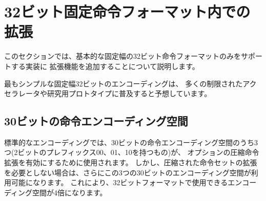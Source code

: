 \begin{comment}
\section{Extensions within fixed-width 32-bit instruction format}
\end{comment}
\section{32ビット固定命令フォーマット内での拡張}
\label{fix32b}

\begin{comment}
In this section, we discuss adding extensions to implementations that
only support the base fixed-width 32-bit instruction format.
\end{comment}
このセクションでは、基本的な固定幅の32ビット命令フォーマットのみをサポートする実装に
拡張機能を追加することについて説明します。

\begin{commentary}
\begin{comment}
We anticipate the simplest fixed-width 32-bit encoding will be popular for
many restricted accelerators and research prototypes.
\end{comment}
最もシンプルな固定幅32ビットのエンコーディングは、
多くの制限されたアクセラレータや研究用プロトタイプに普及すると予想しています。
\end{commentary}

\begin{comment}
\subsection*{Available 30-bit instruction encoding spaces}
\end{comment}
\subsection*{30ビットの命令エンコーディング空間}

\begin{comment}
In the standard encoding, three of the available 30-bit instruction
encoding spaces (those with 2-bit prefixes 00, 01, and 10) are used to
enable the optional compressed instruction extension.  However, if the
compressed instruction-set extension is not required, then these three
further 30-bit encoding spaces become available.  This quadruples the
available encoding space within the 32-bit format.
\end{comment}
標準的なエンコーディングでは、30ビットの命令エンコーディング空間のうち3つ(2ビットのプレフィックス00、01、10を持つもの)が、
オプションの圧縮命令拡張を有効にするために使用されます。
しかし、圧縮された命令セットの拡張を必要としない場合は、さらにこの3つの30ビットのエンコーディング空間が利用可能になります。
これにより、32ビットフォーマットで使用できるエンコーディング空間が4倍になります。

